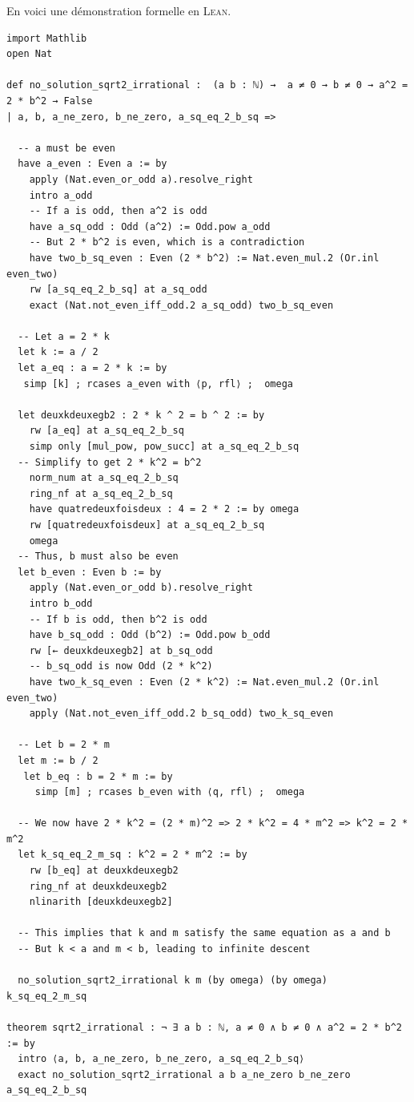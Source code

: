 En voici une démonstration formelle en \textsc{Lean}.
\begin{verbatim}
import Mathlib
open Nat

def no_solution_sqrt2_irrational :  (a b : ℕ) →  a ≠ 0 → b ≠ 0 → a^2 = 2 * b^2 → False
| a, b, a_ne_zero, b_ne_zero, a_sq_eq_2_b_sq =>

  -- a must be even
  have a_even : Even a := by
    apply (Nat.even_or_odd a).resolve_right
    intro a_odd
    -- If a is odd, then a^2 is odd
    have a_sq_odd : Odd (a^2) := Odd.pow a_odd
    -- But 2 * b^2 is even, which is a contradiction
    have two_b_sq_even : Even (2 * b^2) := Nat.even_mul.2 (Or.inl even_two)
    rw [a_sq_eq_2_b_sq] at a_sq_odd
    exact (Nat.not_even_iff_odd.2 a_sq_odd) two_b_sq_even

  -- Let a = 2 * k
  let k := a / 2
  let a_eq : a = 2 * k := by
   simp [k] ; rcases a_even with ⟨p, rfl⟩ ;  omega

  let deuxkdeuxegb2 : 2 * k ^ 2 = b ^ 2 := by
    rw [a_eq] at a_sq_eq_2_b_sq
    simp only [mul_pow, pow_succ] at a_sq_eq_2_b_sq
  -- Simplify to get 2 * k^2 = b^2
    norm_num at a_sq_eq_2_b_sq
    ring_nf at a_sq_eq_2_b_sq
    have quatredeuxfoisdeux : 4 = 2 * 2 := by omega
    rw [quatredeuxfoisdeux] at a_sq_eq_2_b_sq
    omega
  -- Thus, b must also be even
  let b_even : Even b := by
    apply (Nat.even_or_odd b).resolve_right
    intro b_odd
    -- If b is odd, then b^2 is odd
    have b_sq_odd : Odd (b^2) := Odd.pow b_odd
    rw [← deuxkdeuxegb2] at b_sq_odd
    -- b_sq_odd is now Odd (2 * k^2)
    have two_k_sq_even : Even (2 * k^2) := Nat.even_mul.2 (Or.inl even_two)
    apply (Nat.not_even_iff_odd.2 b_sq_odd) two_k_sq_even

  -- Let b = 2 * m
  let m := b / 2
   let b_eq : b = 2 * m := by
     simp [m] ; rcases b_even with ⟨q, rfl⟩ ;  omega

  -- We now have 2 * k^2 = (2 * m)^2 => 2 * k^2 = 4 * m^2 => k^2 = 2 * m^2
  let k_sq_eq_2_m_sq : k^2 = 2 * m^2 := by
    rw [b_eq] at deuxkdeuxegb2
    ring_nf at deuxkdeuxegb2
    nlinarith [deuxkdeuxegb2]

  -- This implies that k and m satisfy the same equation as a and b
  -- But k < a and m < b, leading to infinite descent

  no_solution_sqrt2_irrational k m (by omega) (by omega) k_sq_eq_2_m_sq

theorem sqrt2_irrational : ¬ ∃ a b : ℕ, a ≠ 0 ∧ b ≠ 0 ∧ a^2 = 2 * b^2 := by
  intro ⟨a, b, a_ne_zero, b_ne_zero, a_sq_eq_2_b_sq⟩
  exact no_solution_sqrt2_irrational a b a_ne_zero b_ne_zero a_sq_eq_2_b_sq
\end{verbatim}


